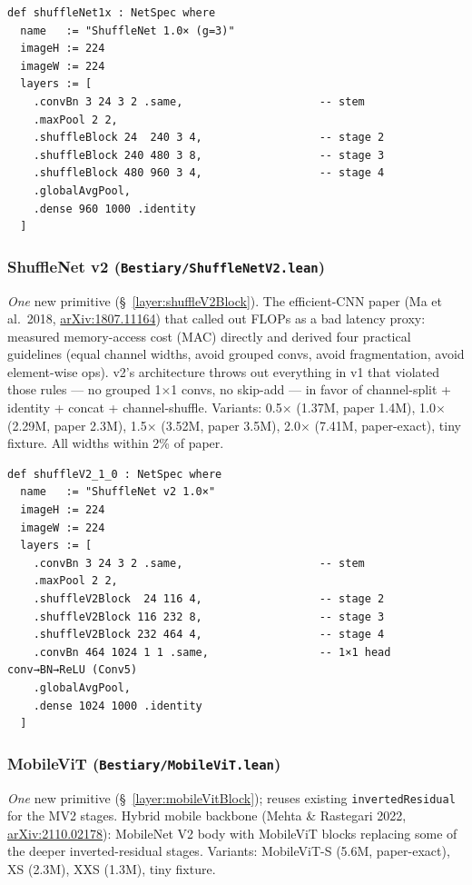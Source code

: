 \begin{verbatim}
def shuffleNet1x : NetSpec where
  name   := "ShuffleNet 1.0× (g=3)"
  imageH := 224
  imageW := 224
  layers := [
    .convBn 3 24 3 2 .same,                     -- stem
    .maxPool 2 2,
    .shuffleBlock 24  240 3 4,                  -- stage 2
    .shuffleBlock 240 480 3 8,                  -- stage 3
    .shuffleBlock 480 960 3 4,                  -- stage 4
    .globalAvgPool,
    .dense 960 1000 .identity
  ]
\end{verbatim}

\subsubsection*{ShuffleNet v2 (\texttt{Bestiary/ShuffleNetV2.lean})}
\emph{One} new primitive (\S~\ref{layer:shuffleV2Block}). The
efficient-CNN paper (Ma et al.\ 2018,
\href{https://arxiv.org/abs/1807.11164}{arXiv:1807.11164}) that called
out FLOPs as a bad latency proxy: measured memory-access cost
(MAC) directly and derived four practical guidelines (equal channel
widths, avoid grouped convs, avoid fragmentation, avoid element-wise
ops). v2's architecture throws out everything in v1 that violated
those rules --- no grouped 1$\times$1 convs, no skip-add --- in
favor of channel-split + identity + concat + channel-shuffle.
Variants: 0.5$\times$ (1.37M, paper 1.4M), 1.0$\times$ (2.29M, paper
2.3M), 1.5$\times$ (3.52M, paper 3.5M), 2.0$\times$ (7.41M,
paper-exact), tiny fixture. All widths within 2\% of paper.

\begin{verbatim}
def shuffleV2_1_0 : NetSpec where
  name   := "ShuffleNet v2 1.0×"
  imageH := 224
  imageW := 224
  layers := [
    .convBn 3 24 3 2 .same,                     -- stem
    .maxPool 2 2,
    .shuffleV2Block  24 116 4,                  -- stage 2
    .shuffleV2Block 116 232 8,                  -- stage 3
    .shuffleV2Block 232 464 4,                  -- stage 4
    .convBn 464 1024 1 1 .same,                 -- 1×1 head conv→BN→ReLU (Conv5)
    .globalAvgPool,
    .dense 1024 1000 .identity
  ]
\end{verbatim}

\subsubsection*{MobileViT (\texttt{Bestiary/MobileViT.lean})}
\emph{One} new primitive (\S~\ref{layer:mobileVitBlock}); reuses existing
\texttt{invertedResidual} for the MV2 stages. Hybrid mobile backbone
(Mehta \& Rastegari 2022,
\href{https://arxiv.org/abs/2110.02178}{arXiv:2110.02178}):
MobileNet V2 body with MobileViT blocks replacing some of the deeper
inverted-residual stages. Variants: MobileViT-S (5.6M, paper-exact),
XS (2.3M), XXS (1.3M), tiny fixture.

